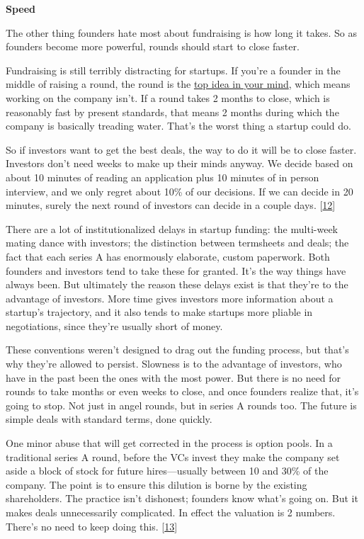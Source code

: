 \textbf{Speed}

The other thing founders hate most about fundraising is how long it
takes. So as founders become more powerful, rounds should start to close
faster.

Fundraising is still terribly distracting for startups. If you're a
founder in the middle of raising a round, the round is the
\href{top.html}{top idea in your mind}, which means working on the
company isn't. If a round takes 2 months to close, which is reasonably
fast by present standards, that means 2 months during which the company
is basically treading water. That's the worst thing a startup could do.

So if investors want to get the best deals, the way to do it will be to
close faster. Investors don't need weeks to make up their minds anyway.
We decide based on about 10 minutes of reading an application plus 10
minutes of in person interview, and we only regret about 10\% of our
decisions. If we can decide in 20 minutes, surely the next round of
investors can decide in a couple days. {[}\hyperref[f12n]{12}{]}

There are a lot of institutionalized delays in startup funding: the
multi-week mating dance with investors; the distinction between
termsheets and deals; the fact that each series A has enormously
elaborate, custom paperwork. Both founders and investors tend to take
these for granted. It's the way things have always been. But ultimately
the reason these delays exist is that they're to the advantage of
investors. More time gives investors more information about a startup's
trajectory, and it also tends to make startups more pliable in
negotiations, since they're usually short of money.

These conventions weren't designed to drag out the funding process, but
that's why they're allowed to persist. Slowness is to the advantage of
investors, who have in the past been the ones with the most power. But
there is no need for rounds to take months or even weeks to close, and
once founders realize that, it's going to stop. Not just in angel
rounds, but in series A rounds too. The future is simple deals with
standard terms, done quickly.

One minor abuse that will get corrected in the process is option pools.
In a traditional series A round, before the VCs invest they make the
company set aside a block of stock for future hires---usually between 10
and 30\% of the company. The point is to ensure this dilution is borne
by the existing shareholders. The practice isn't dishonest; founders
know what's going on. But it makes deals unnecessarily complicated. In
effect the valuation is 2 numbers. There's no need to keep doing this.
{[}\hyperref[f13n]{13}{]}

